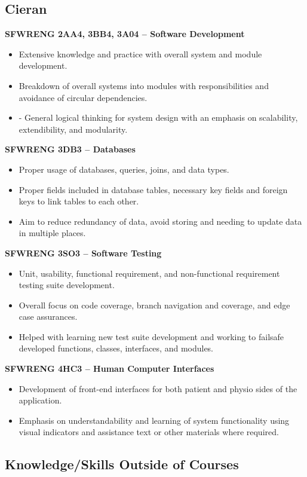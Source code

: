 \documentclass{article}
\begin{document}
\subsection{Cieran}

\textbf{SFWRENG 2AA4, 3BB4, 3A04 – Software Development}
\begin{itemize}
    \item Extensive knowledge and practice with overall system and module development.
    \item Breakdown of overall systems into modules with responsibilities and avoidance of circular dependencies.
    \item -	General logical thinking for system design with an emphasis on scalability, extendibility, and modularity.
\end{itemize}
\textbf{SFWRENG 3DB3 – Databases}
\begin{itemize}
    \item Proper usage of databases, queries, joins, and data types.
    \item Proper fields included in database tables, necessary key fields and foreign keys to link tables to each other.
    \item Aim to reduce redundancy of data, avoid storing and needing to update data in multiple places.
\end{itemize}
\textbf{SFWRENG 3SO3 – Software Testing}
\begin{itemize}
    \item Unit, usability, functional requirement, and non-functional requirement testing suite development.
    \item Overall focus on code coverage, branch navigation and coverage, and edge case assurances.
    \item Helped with learning new test suite development and working to failsafe developed functions, classes, interfaces, and modules.
\end{itemize}
\textbf{SFWRENG 4HC3 – Human Computer Interfaces}
\begin{itemize}
    \item Development of front-end interfaces for both patient and physio sides of the application.
    \item Emphasis on understandability and learning of system functionality using visual indicators and assistance text or other materials where required.
\end{itemize}

\subsection{Knowledge/Skills Outside of Courses}
\end{document}
